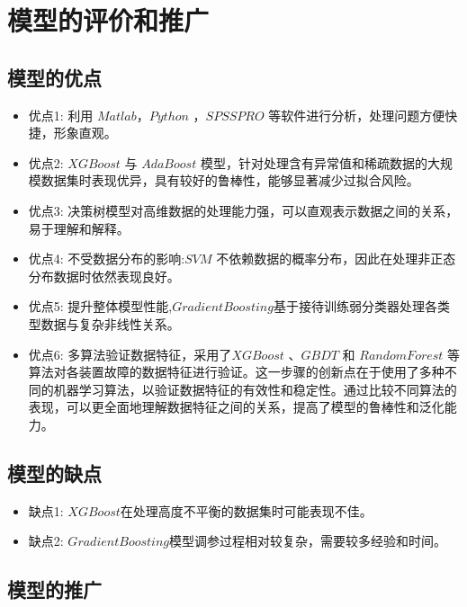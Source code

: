 \documentclass[withoutpreface,bwprint]{cumcmthesis}
\begin{document}
\section{模型的评价和推广}

\subsection{模型的优点}
\begin{itemize}[itemindent=2em]
\item 优点1: 利用 \(Matlab\)，\(Python\) ，\(SPSSPRO\) 等软件进行分析，处理问题方便快捷，形象直观。

\item 优点2: \(XGBoost\) 与 \(AdaBoost\) 模型，针对处理含有异常值和稀疏数据的大规模数据集时表现优异，具有较好的鲁棒性，能够显著减少过拟合风险。

\item 优点3: 决策树模型对高维数据的处理能力强，可以直观表示数据之间的关系，易于理解和解释。

\item 优点4: 不受数据分布的影响:\(SVM\) 不依赖数据的概率分布，因此在处理非正态分布数据时依然表现良好。

\item 优点5: 提升整体模型性能,\(Gradient Boosting\)基于接待训练弱分类器处理各类型数据与复杂非线性关系。

\item 优点6: 多算法验证数据特征，采用了\(XGBoost\) 、\(GBDT\) 和 \(RandomForest\) 等算法对各装置故障的数据特征进行验证。这一步骤的创新点在于使用了多种不同的机器学习算法，以验证数据特征的有效性和稳定性。通过比较不同算法的表现，可以更全面地理解数据特征之间的关系，提高了模型的鲁棒性和泛化能力。

\end{itemize}

\subsection{模型的缺点}
\begin{itemize}[itemindent=2em]
\item 缺点1: \(XGBoost\)在处理高度不平衡的数据集时可能表现不佳。
\item 缺点2: \(Gradient Boosting\)模型调参过程相对较复杂，需要较多经验和时间。
\end{itemize}

\subsection{模型的推广}
\end{document}
